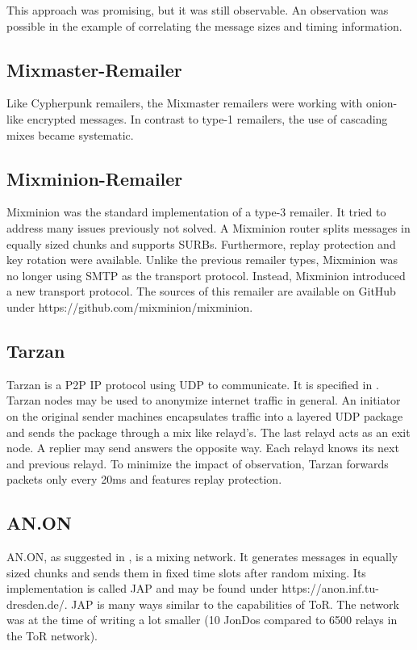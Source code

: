 This approach was promising, but it was still observable. An observation was possible in the example of correlating the message sizes and timing information.

\subsection{Mixmaster-Remailer\label{sec:remMixmaster}}
Like Cypherpunk remailers, the Mixmaster remailers were working with onion-like encrypted messages. In contrast to type-1 remailers, the use of cascading mixes became systematic.

\subsection{Mixminion-Remailer\label{sec:remMixminion}}
Mixminion was the standard implementation of a type-3 remailer. It tried to address many issues previously not solved. A Mixminion router splits messages in equally sized chunks and supports SURBs. Furthermore,  replay protection and key rotation were available. Unlike the previous remailer types, Mixminion was no longer using SMTP as the transport protocol. Instead, Mixminion introduced a new transport protocol. The sources of this remailer are available on GitHub under https://github.com/mixminion/mixminion.

\subsection{Tarzan}
Tarzan is a P2P IP protocol using UDP to communicate. It is specified in \cite{tarzan:ccs02}. Tarzan nodes may be used to anonymize internet traffic in general. An initiator on the original sender machines encapsulates traffic into a layered UDP package and sends the package through a mix like relayd's. The last relayd acts as an exit node. A replier may send answers the opposite way. Each relayd knows its next and previous relayd. To minimize the impact of observation, Tarzan forwards packets only every 20ms and features replay protection.

\subsection{AN.ON}
AN.ON, as suggested in \cite{federrath2003system}, is a mixing network. It generates messages in equally sized chunks and sends them in fixed time slots after random mixing. Its implementation is called JAP and may be found under https://anon.inf.tu-dresden.de/. JAP is many ways similar to the capabilities of ToR. The network was at the time of writing a lot smaller (10 JonDos compared to 6500 relays in the ToR network).

